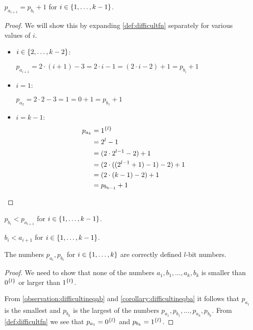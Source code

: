 \begin{observation}
\label{observation:difficultprefixdist}
$p_{a_{i+1}} = p_{b_i} + 1$ for $i \in \{1, \ldots, k-1\}$.
\end{observation}

\begin{proof}
We will show this by expanding \cref{def:difficultfn}
separately for various values of $i$.

\begin{itemize}
\item $i \in \{2, \ldots, k-2\}$:

$p_{a_{i+1}}
= 2 \cdot (i+1) - 3
= 2 \cdot i - 1
= (2 \cdot i - 2) + 1
= p_{b_i} + 1$

\item $i = 1$:

$p_{a_2}
= 2 \cdot 2 - 3
= 1
= 0 + 1
= p_{b_1} + 1$

\item $i = k-1$:
\begin{align*}
p_{a_k}
&= 1^{\{l\}} \\
&= 2^l - 1 \\
&= (2 \cdot 2^{l-1} - 2) + 1 \\
&= (2 \cdot ((2^{l-1} + 1) - 1) - 2) + 1 \\
&= (2 \cdot (k-1) - 2) + 1 \\
&= p_{b_{k-1}} + 1
\end{align*}
\end{itemize}
\end{proof}

\begin{corollary}
\label{corollary:difficultineqba}
$p_{b_i} < p_{a_{i+1}}$
for $i \in \{1, \ldots, k-1\}$.
\end{corollary}

\begin{corollary}
\label{corollary:difficultineqbafull}
$b_i < a_{i+1}$
for $i \in \{1, \ldots, k-1\}$.
\end{corollary}

\begin{observation}
\label{observation:difficultprefixlbit}
The numbers $p_{a_i}, p_{b_i}$
for $i \in \{1, \ldots, k\}$
are correctly defined $l$-bit numbers.
\end{observation}

\begin{proof}
We need to show that none of the numbers $a_1, b_1, \ldots, a_k, b_k$
is smaller than $0^{\{l\}}$
or larger than $1^{\{l\}}$.

From \cref{observation:difficultineqab}
and \cref{corollary:difficultineqba}
it follows that $p_{a_1}$ is the smallest
and $p_{b_k}$ is the largest
of the numbers $p_{a_1}, p_{b_1}, \ldots, p_{a_k}, p_{b_k}$.
From \cref{def:difficultfn} we see that
$p_{a_1} = 0^{\{l\}}$
and $p_{b_k} = 1^{\{l\}}$.
\end{proof}

